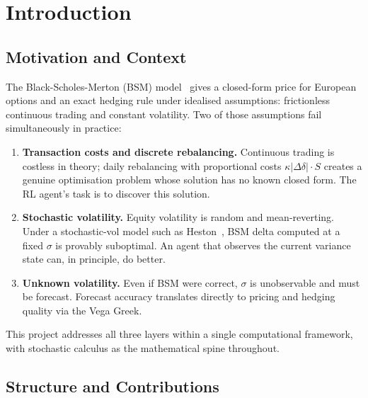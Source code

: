 \documentclass[12pt,a4paper]{article}
\begin{document}
\section{Introduction}
\label{sec:intro}

\subsection{Motivation and Context}

The Black-Scholes-Merton (BSM) model~\citep{Black1973,Merton1973} gives a
closed-form price for European options and an exact hedging rule under
idealised assumptions: frictionless continuous trading and constant volatility.
Two of those assumptions fail simultaneously in practice:

\begin{enumerate}[leftmargin=*]
  \item \textbf{Transaction costs and discrete rebalancing.}  Continuous trading
        is costless in theory; daily rebalancing with proportional costs
        $\kappa|\Delta\delta|\cdot S$ creates a genuine optimisation problem
        whose solution has no known closed form.  The RL agent's task is to
        discover this solution.

  \item \textbf{Stochastic volatility.}  Equity volatility is random and
        mean-reverting.  Under a stochastic-vol model such as
        Heston~\citep{Heston1993}, BSM delta computed at a fixed $\sigma$ is
        provably suboptimal.  An agent that observes the current variance state
        can, in principle, do better.

  \item \textbf{Unknown volatility.}  Even if BSM were correct, $\sigma$ is
        unobservable and must be forecast.  Forecast accuracy translates
        directly to pricing and hedging quality via the Vega Greek.
\end{enumerate}

This project addresses all three layers within a single computational framework,
with stochastic calculus as the mathematical spine throughout.

\subsection{Structure and Contributions}
\end{document}
